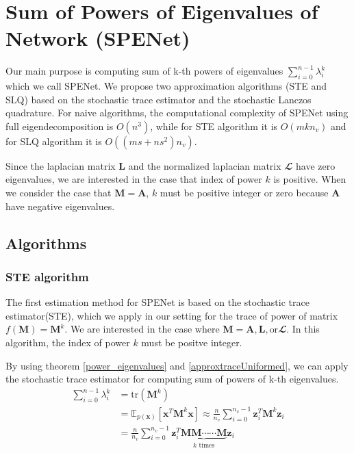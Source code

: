 \documentclass[senior,final,11pt]{iscs-thesis}
\begin{document}
\chapter{Sum of Powers of Eigenvalues of Network (SPENet)}
Our main purpose is computing sum of k-th powers of eigenvalues $\sum_{i=0}^{n-1} \lambda_i^k$ which we call SPENet. We propose two approximation algorithms (STE and SLQ) based on the stochastic trace estimator and the stochastic Lanczos quadrature. For naive algorithms, the computational complexity of SPENet using full eigendecomposition is $O(n^3)$, while for STE algorithm it is $O(m k n_v)$ and for SLQ algorithm it is $O((ms + ns^2) n_v)$.

Since the laplacian matrix ${\mathbf L}$ and the normalized laplacian matrix ${\mathbfcal L}$ have zero eigenvalues, we are interested in the case that index of power $k$ is positive. When we consider the case that ${\mathbf M} = {\mathbf A}$, $k$ must be positive integer or zero because ${\mathbf A}$ have negative eigenvalues.


\section{Algorithms}
\subsection{STE algorithm}
The first estimation method for SPENet is based on the stochastic trace estimator(STE), which we apply in our setting for the trace of power of matrix $f({\mathbf M})={\mathbf M}^k$. We are interested in the case where ${\mathbf M} = {\mathbf A}, {\mathbf L}, \text{or} {\mathbfcal L}$. In this algorithm, the index of power $k$ must be positve integer.

By using theorem \ref{power_eigenvalues} and \ref{approxtraceUniformed}, we can apply the stochastic trace estimator for computing sum of powers of k-th eigenvalues.
\begin{align}
    \sum_{i=0}^{n-1} \lambda_i^k &= \mathrm{tr}({\mathbf M}^k)  \nonumber\\
    &= \mathbb{E}_{p(\mathbf{x})}[\mathbf{x}^{T}{\mathbf M}^k \mathbf{x}] \approx \frac{n}{n_v}\sum_{i=0}^{n_v-1} \mathbf{z}_i^{T}{\mathbf M}^k\mathbf{z}_i \\
    &= \frac{n}{n_v}\sum_{i=0}^{n_v-1} \mathbf{z}_i^{T} \underbrace{{\mathbf M}{\mathbf M} \cdots \cdots {\mathbf M}}_{k \text{ times}} \mathbf{z}_i
\end{align}
\end{document}
